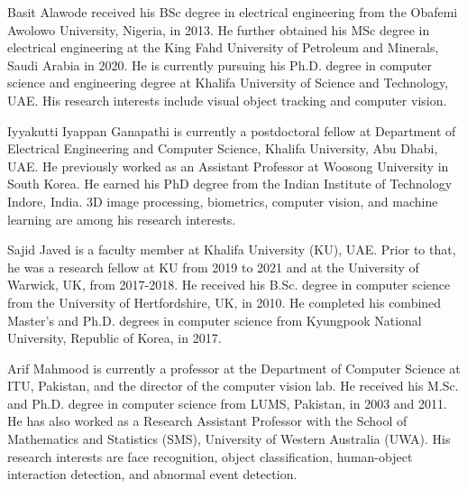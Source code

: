 \documentclass[journal]{IEEEtran}
\begin{document}
\vspace{-15mm}
\begin{IEEEbiography}
	{Basit Alawode}
received his BSc degree in electrical engineering from the Obafemi Awolowo University, Nigeria, in 2013. 
He further obtained his MSc degree in electrical engineering at the King Fahd University of Petroleum and Minerals, Saudi Arabia in 2020. 
He is currently pursuing his Ph.D. degree in computer science and engineering degree at Khalifa University of Science and Technology, UAE.
His research interests include visual object tracking and computer vision.
\end{IEEEbiography}
\vspace{-15mm}
\begin{IEEEbiography}
{Iyyakutti Iyappan Ganapathi} is currently a postdoctoral fellow at Department of Electrical Engineering and Computer Science, Khalifa University, Abu Dhabi, UAE. He previously worked as an Assistant Professor at Woosong University in South Korea. He earned his PhD degree from the Indian Institute of Technology Indore, India. 3D image processing, biometrics, computer vision, and machine learning are among his research interests.
\end{IEEEbiography}
\vspace{-15mm}
\begin{IEEEbiography}
	{Sajid Javed}
is a faculty member at Khalifa University (KU), UAE. 
Prior to that, he was a research fellow at KU from 2019 to 2021 and at the University of Warwick, UK, from 2017-2018. 
He received his B.Sc. degree in computer science from the University of Hertfordshire, UK, in 2010. 
He completed his combined Master’s and Ph.D. degrees in computer science from Kyungpook National University, Republic of Korea, in 2017.
\end{IEEEbiography}
\vspace{-15mm}
\begin{IEEEbiography}
{Arif Mahmood}
is currently a professor at the Department of Computer Science at ITU, Pakistan, and the director of the computer vision lab.
He received his M.Sc. and Ph.D. degree in computer science from LUMS, Pakistan, in 2003 and 2011.
He has also worked as a Research Assistant Professor with the School of Mathematics and Statistics (SMS), University of Western Australia (UWA).
His research interests are face recognition, object classification, human-object interaction detection, and abnormal event detection. 
\end{IEEEbiography}
\end{document}
